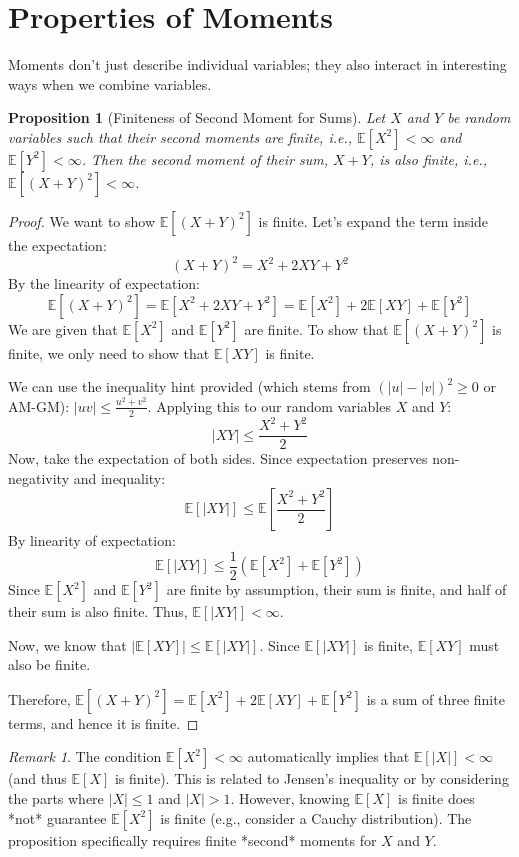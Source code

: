 \documentclass[11pt, letterpaper]{article}
\theoremstyle{plain} %
\newtheorem{proposition}[theorem]{Proposition}
\theoremstyle{definition} %
\theoremstyle{remark} %
\newtheorem{remark}[theorem]{Remark}
\newcommand{\E}{\mathbb{E}}
\begin{document}
\section{Properties of Moments}

Moments don't just describe individual variables; they also interact in interesting ways when we combine variables.

\begin{proposition}[Finiteness of Second Moment for Sums] \label{prop:finite_moment_sum}
Let $X$ and $Y$ be random variables such that their second moments are finite, i.e., $\E[X^2] < \infty$ and $\E[Y^2] < \infty$. Then the second moment of their sum, $X+Y$, is also finite, i.e., $\E[(X+Y)^2] < \infty$.
\end{proposition}

\begin{proof}
We want to show $\E[(X+Y)^2]$ is finite. Let's expand the term inside the expectation:
\[ (X+Y)^2 = X^2 + 2XY + Y^2 \]
By the linearity of expectation:
\[ \E[(X+Y)^2] = \E[X^2 + 2XY + Y^2] = \E[X^2] + 2\E[XY] + \E[Y^2] \]
We are given that $\E[X^2]$ and $\E[Y^2]$ are finite. To show that $\E[(X+Y)^2]$ is finite, we only need to show that $\E[XY]$ is finite.

We can use the inequality hint provided (which stems from $(|u|-|v|)^2 \ge 0$ or AM-GM): $|uv| \le \frac{u^2+v^2}{2}$.
Applying this to our random variables $X$ and $Y$:
\[ |XY| \le \frac{X^2+Y^2}{2} \]
Now, take the expectation of both sides. Since expectation preserves non-negativity and inequality:
\[ \E[|XY|] \le \E\left[\frac{X^2+Y^2}{2}\right] \]
By linearity of expectation:
\[ \E[|XY|] \le \frac{1}{2} (\E[X^2] + \E[Y^2]) \]
Since $\E[X^2]$ and $\E[Y^2]$ are finite by assumption, their sum is finite, and half of their sum is also finite. Thus, $\E[|XY|] < \infty$.

Now, we know that $|\E[XY]| \le \E[|XY|]$. Since $\E[|XY|]$ is finite, $\E[XY]$ must also be finite.

Therefore, $\E[(X+Y)^2] = \E[X^2] + 2\E[XY] + \E[Y^2]$ is a sum of three finite terms, and hence it is finite.
\end{proof}

\begin{remark}
The condition $\E[X^2] < \infty$ automatically implies that $\E[|X|] < \infty$ (and thus $\E[X]$ is finite). This is related to Jensen's inequality or by considering the parts where $|X| \le 1$ and $|X|>1$. However, knowing $\E[X]$ is finite does *not* guarantee $\E[X^2]$ is finite (e.g., consider a Cauchy distribution). The proposition specifically requires finite *second* moments for $X$ and $Y$.
\end{remark}

\end{document}
